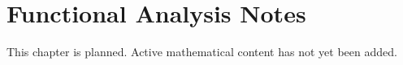 
\section{Functional Analysis Notes}
\begin{remark*}[Status]
This chapter is planned. Active mathematical content has not yet been added.
\end{remark*}
